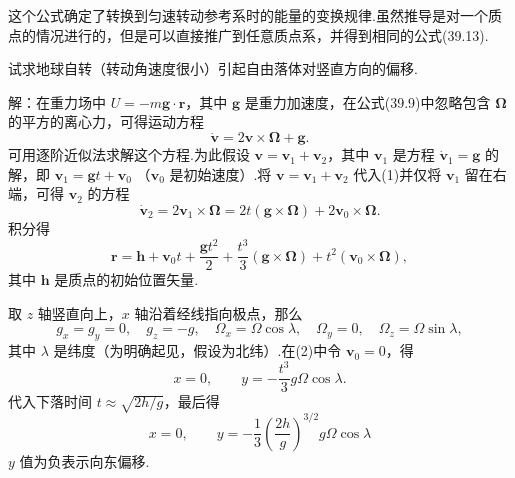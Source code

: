 这个公式确定了转换到匀速转动参考系时的能量的变换规律.虽然推导是对一个质点的情况进行的，但是可以直接推广到任意质点系，并得到相同的公式(39.13).

\begin{xiti}

\quad 试求地球自转（转动角速度很小）引起自由落体对竖直方向的偏移.

解：在重力场中 $U=-m\boldsymbol{g}\cdot\boldsymbol{r}$，其中 $\boldsymbol{g}$ 是重力加速度，在公式(39.9)中忽略包含 $\boldsymbol{\Omega}$ 的平方的离心力，可得运动方程
\begin{equation*}
  \dot{\boldsymbol{v}}=2\boldsymbol{v}\times\boldsymbol{\Omega}
  +\boldsymbol{g}.
  \tag{1}
\end{equation*}
可用逐阶近似法求解这个方程.为此假设 $\boldsymbol{v}=\boldsymbol{v}_1+\boldsymbol{v}_2$，其中 $\boldsymbol{v}_1$ 是方程
$\dot{\boldsymbol{v}}_1=\boldsymbol{g}$ 的解，即
$\boldsymbol{v}_1=\boldsymbol{g}t+\boldsymbol{v}_0$
（$\boldsymbol{v}_0$ 是初始速度）.将
$\boldsymbol{v}=\boldsymbol{v}_1+\boldsymbol{v}_2$ 代入(1)并仅将 $\boldsymbol{v}_1$ 留在右端，可得 $\boldsymbol{v}_2$ 的方程
\begin{equation*}
  \dot{\boldsymbol{v}}_2=2\boldsymbol{v}_1\times\boldsymbol{\Omega}
  =2t\left(\boldsymbol{g}\times\boldsymbol{\Omega}\right)
  +2\boldsymbol{v}_0\times\boldsymbol{\Omega}.
\end{equation*}
积分得
\begin{equation*}
  \boldsymbol{r}=\boldsymbol{h}+\boldsymbol{v}_0t
  +\frac{\boldsymbol{g}t^2}{2}
  +\frac{t^3}{3}\left(\boldsymbol{g}\times\boldsymbol{\Omega}\right)
  +t^2\left(\boldsymbol{v}_0\times\boldsymbol{\Omega}\right),
  \tag{2}
\end{equation*}
其中 $\boldsymbol{h}$ 是质点的初始位置矢量.

取 $z$ 轴竖直向上，$x$ 轴沿着经线指向极点，那么
\begin{equation*}
  g_x=g_y=0,\quad g_z=-g,\quad
  \Omega_x=\Omega\cos\lambda,\quad
  \Omega_y=0,\quad
  \Omega_z=\Omega\sin\lambda,
\end{equation*}
其中 $\lambda$ 是纬度（为明确起见，假设为北纬）.在(2)中令 $\boldsymbol{v}_0=0$，得
\begin{equation*}
  x=0,\qquad
  y=-\frac{t^3}{3}g\Omega\cos\lambda.
\end{equation*}
代入下落时间 $t\approx\sqrt{2h/g}$，最后得
\begin{equation*}
  x=0,\qquad
  y=-\frac{1}{3}\left(\frac{2h}{g}\right)^{3/2}g\Omega\cos\lambda
\end{equation*}
$y$ 值为负表示向东偏移.


\end{xiti}
